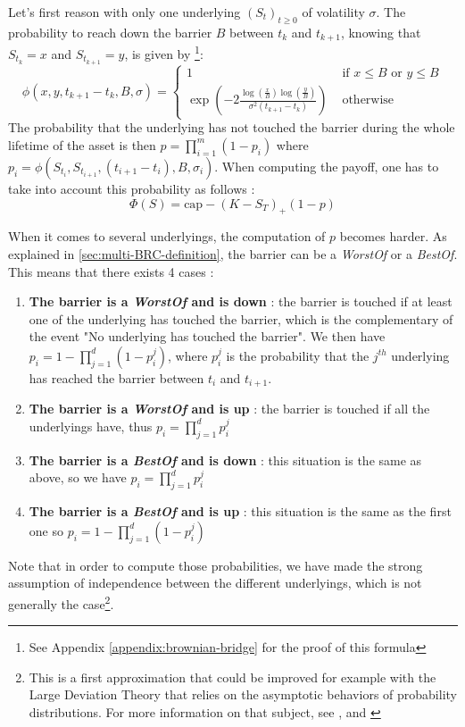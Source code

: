 \documentclass[a4paper,11pt,english]{book}
\begin{document}
Let's first reason with only one underlying $(S_{t})_{t\geq0}$ of volatility $\sigma$. The probability to reach down the barrier $B$ between $t_{k}$ and $t_{k+1}$, knowing that $S_{t_{k}}=x$ and $S_{t_{k+1}}=y$, is given by \footnote{See Appendix \ref{appendix:brownian-bridge} for the proof of this formula}:
$$\phi(x,y,t_{k+1}-t_k,B,\sigma) = 
\begin{cases}
1 &\text{ if } x\leq B \text{ or } y\leq B \\
\exp(-2\frac{\log(\frac{x}{B})\log(\frac{y}{B})}{\sigma^{2}(t_{k+1}-t_k)}) &\text{ otherwise }
\end{cases}$$
The probability that the underlying has not touched the barrier during the whole lifetime of the asset is then $p=\prod_{i=1}^{m}(1-p_{i})$ where $p_{i}=\phi(S_{t_{i}},S_{t_{i+1}},(t_{i+1}-t_i),B,\sigma_{i})$. When computing the payoff, one has to take into account this probability as follows :
$$\Phi(S) = \text{cap} -(K-S_{T})_{+}(1-p)$$

When it comes to several underlyings, the computation of $p$ becomes harder. As explained in \ref{sec:multi-BRC-definition}, the barrier can be a \textit{WorstOf} or a \textit{BestOf}. This means that there exists 4 cases :
\begin{enumerate}
    \item \textbf{The barrier is a \textit{WorstOf} and is down} : the barrier is touched if at least one of the underlying has touched the barrier, which is the complementary of the event "No underlying has touched the barrier". We then have $p_{i}=1-\prod_{j=1}^{d}(1-p_{i}^{j})$, where $p_{i}^{j}$ is the probability that the $j^{th}$ underlying has reached the barrier between $t_{i}$ and $t_{i+1}$.
    
    \item \textbf{The barrier is a \textit{WorstOf} and is up} : the barrier is touched if all the underlyings have, thus $p_{i}=\prod_{j=1}^{d}p_{i}^{j}$
    
    \item \textbf{The barrier is a \textit{BestOf} and is down} : this situation is the same as above, so we have $p_{i}=\prod_{j=1}^{d}p_{i}^{j}$
    
    \item \textbf{The barrier is a \textit{BestOf} and is up} : this situation is the same as the first one so  $p_{i}=1-\prod_{j=1}^{d}(1-p_{i}^{j})$
\end{enumerate}
Note that in order to compute those probabilities, we have made the strong assumption of independence between the different underlyings, which is not generally the case\footnote{This is a first approximation that could be improved for example with the Large Deviation Theory that relies on the asymptotic behaviors of probability distributions. For more information on that subject, see \cite{baldi1995exact}, \cite{baldi1999pricing} and \cite{huh2008computation}}.
\end{document}
